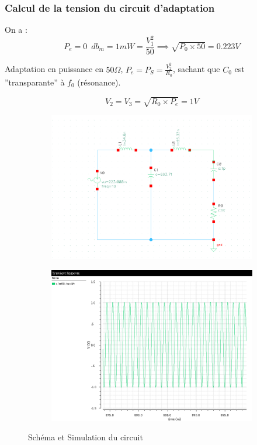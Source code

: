 \documentclass[a4paper]{article}
\begin{document}
\subsubsection{Calcul de la tension du circuit d'adaptation}
On a :
\[
P_e = 0 \phantom{4} db_{m} = 1 mW = \frac{V^2_1}{50} \implies \sqrt{P_0 \times 50} = 0.223 V
\]

Adaptation en puissance en $50 \Omega$, $ P_e = P_S = \frac{V^2_2}{R_0}$, sachant que $C_0$ est ''transparante'' \`a $f_0$ (r\'esonance).

\[
  V_2 = V_3 = \sqrt{R_0 \times P_e} = 1 V
\]
\begin{figure}[!htb]
  \centering
  \begin{subfigure}[t]{.5\linewidth}
      \centering
      \includegraphics[width=1\linewidth]{V-Adaptation.png}
      \label{fig:Adaptation-V}
  \end{subfigure}%
  \begin{subfigure}[t]{.5\linewidth}
    \centering
    \includegraphics[width=1\linewidth]{V-Adaptation-sim.png}
    \label{fig:Adaptation-V-sim}
  \end{subfigure}%
  \caption{Sch\'ema et Simulation du circuit}
  \label{fig:Adaptation-sim}
\end{figure}
\end{document}
